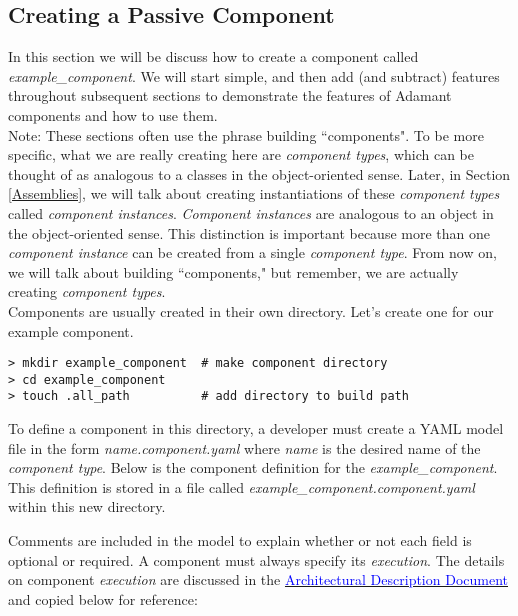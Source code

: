 \subsection{Creating a Passive Component} \label{Creating a Passive Component}

In this section we will be discuss how to create a component called \textit{example\_component}. We will start simple, and then add (and subtract) features throughout subsequent sections to demonstrate the features of Adamant components and how to use them. \\

Note: These sections often use the phrase building ``components". To be more specific, what we are really creating here are \textit{component types}, which can be thought of as analogous to a classes in the object-oriented sense. Later, in Section \ref{Assemblies}, we will talk about creating instantiations of these \textit{component types} called \textit{component instances}. \textit{Component instances} are analogous to an object in the object-oriented sense. This distinction is important because more than one \textit{component instance} can be created from a single \textit{component type}. From now on, we will talk about building ``components," but remember, we are actually creating \textit{component types}. \\

Components are usually created in their own directory. Let's create one for our example component.

\vspace{5mm} %
\begin{verbatim}
> mkdir example_component  # make component directory
> cd example_component 
> touch .all_path          # add directory to build path
\end{verbatim}
\vspace{5mm} %

To define a component in this directory, a developer must create a YAML model file in the form \textit{name.component.yaml} where \textit{name} is the desired name of the \textit{component type}. Below is the component definition for the \textit{example\_component}. This definition is stored in a file called \textit{example\_component.component.yaml} within this new directory.


Comments are included in the model to explain whether or not each field is optional or required. A component must always specify its \textit{execution}. The details on component \textit{execution} are discussed in the \href{https://github.com/lasp/adamant/blob/main/doc/architecture_description_document/architecture_description_document.pdf}{\textcolor{blue}{Architectural Description Document}} and copied below for reference:

